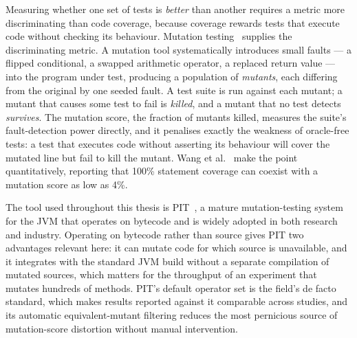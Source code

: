 Measuring whether one set of tests is \emph{better} than another requires a
metric more discriminating than code coverage, because coverage rewards tests
that execute code without checking its behaviour. Mutation
testing~\cite{papadakis2019mutation} supplies the discriminating metric. A
mutation tool systematically introduces small faults --- a flipped
conditional, a swapped arithmetic operator, a replaced return value --- into
the program under test, producing a population of \emph{mutants}, each
differing from the original by one seeded fault. A test suite is run against
each mutant; a mutant that causes some test to fail is \emph{killed}, and a
mutant that no test detects \emph{survives}. The mutation score, the fraction
of mutants killed, measures the suite's fault-detection power directly, and it
penalises exactly the weakness of oracle-free tests: a test that executes code
without asserting its behaviour will cover the mutated line but fail to kill
the mutant. Wang et al.~\cite{wang2025mutgen} make the point quantitatively,
reporting that 100\% statement coverage can coexist with a mutation score as
low as 4\%.

The tool used throughout this thesis is PIT~\cite{coles2016pitest}, a mature
mutation-testing system for the JVM that operates on bytecode and is widely
adopted in both research and industry. Operating on bytecode rather than source
gives PIT two advantages relevant here: it can mutate code for which source is
unavailable, and it integrates with the standard JVM build without a separate
compilation of mutated sources, which matters for the throughput of an experiment
that mutates hundreds of methods. PIT's default operator set is the field's de
facto standard, which makes results reported against it comparable across studies,
and its automatic equivalent-mutant filtering reduces the most pernicious source of
mutation-score distortion without manual intervention.

